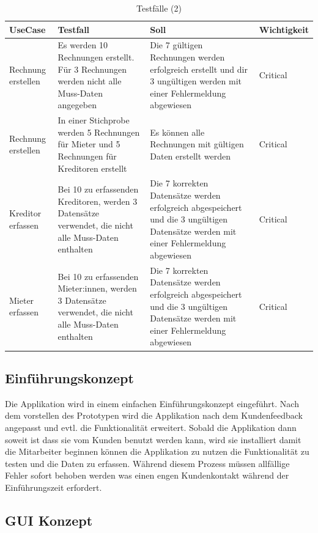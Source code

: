 \begin{table}[H]
  \centering
  \settowidth{}
  \setlength\extrarowheight{2pt}
  \begin{tabulary}{1.0\textwidth}{|L|L|L|L|}
    \hline
    \textbf{UseCase} & 
    \textbf{Testfall}& 
    \textbf{Soll} &
    \textbf{Wichtigkeit}\\
    \hline 
    Rechnung erstellen & Es werden 10 Rechnungen erstellt. Für 3 Rechnungen werden nicht alle Muss-Daten angegeben & Die 7 gültigen Rechnungen werden erfolgreich erstellt und dir 3 ungültigen werden mit einer Fehlermeldung abgewiesen & Critical\\
    \hline   
    Rechnung erstellen & In einer Stichprobe werden 5 Rechnungen für Mieter und 5 Rechnungen für Kreditoren erstellt & Es können alle Rechnungen mit gültigen Daten erstellt werden & Critical\\
    \hline
    Kreditor erfassen & Bei 10 zu erfassenden Kreditoren, werden 3 Datensätze verwendet, die nicht alle Muss-Daten enthalten & Die 7 korrekten Datensätze werden erfolgreich abgespeichert und die 3 ungültigen Datensätze werden mit einer Fehlermeldung abgewiesen & Critical\\
    \hline
    Mieter erfassen & Bei 10 zu erfassenden Mieter:innen, werden 3 Datensätze verwendet, die nicht alle Muss-Daten enthalten & Die 7 korrekten Datensätze werden erfolgreich abgespeichert und die 3 ungültigen Datensätze werden mit einer Fehlermeldung abgewiesen & Critical\\
    \hline
  \end{tabulary}
  \caption{Testfälle (2)}
  \label{Testfälle2}
\end{table}
\subsection{Einführungskonzept}
 Die Applikation wird in einem einfachen Einführungskonzept eingeführt. Nach dem vorstellen des Prototypen wird die Applikation nach dem Kundenfeedback angepasst und evtl. die Funktionalität erweitert. Sobald die Applikation dann soweit ist dass sie vom Kunden benutzt werden kann, wird sie installiert damit die Mitarbeiter beginnen können die Applikation zu nutzen die Funktionalität zu testen und die Daten zu erfassen. Während diesem Prozess müssen allfällige Fehler sofort behoben werden was einen engen Kundenkontakt während der Einführungszeit erfordert. 

\subsection{GUI Konzept}
